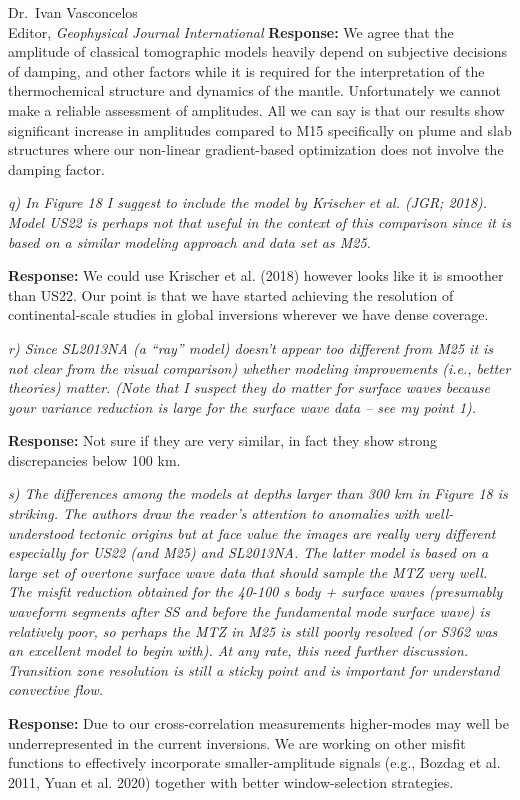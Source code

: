 \documentclass[11pt,a4paper]{letter}
\newcommand{\response}[1]{\textbf{Response:} #1}
\newcommand{\rev}[1]{{\it{#1}}}
\begin{document}
\begin{letter}{Dr.~Ivan Vasconcelos\\
Editor, \textit{Geophysical Journal International}}
\response{We agree that the amplitude of classical tomographic models heavily depend on subjective decisions of damping, and other factors while it is required for the interpretation of the thermochemical structure and dynamics of the mantle. Unfortunately we cannot make a reliable assessment of amplitudes. All we can say is that our results show significant increase in amplitudes compared to M15 specifically on plume and slab structures where our non-linear gradient-based optimization does not involve the damping factor.}


\rev{q) In Figure 18 I suggest to include the model by Krischer et al. (JGR; 2018). Model US22 is perhaps not that useful in the context of this comparison since it is based on a similar modeling approach and data set as M25.}

\response{We could use Krischer et al. (2018) however looks like it is smoother than US22. Our point is that we have started achieving the resolution of continental-scale studies in global inversions wherever we have dense coverage.}

\rev{r) Since SL2013NA (a ``ray'' model) doesn't appear too different from M25 it is not clear from the visual comparison) whether modeling improvements (i.e., better theories) matter.
(Note that I suspect they do matter for surface waves because your variance reduction is large for the surface wave data -- see my point 1).}

\response{Not sure if they are very similar, in fact they show strong discrepancies below 100 km. }

\rev{s) The differences among the models at depths larger than 300 km in Figure 18 is striking.
The authors draw the reader's attention to anomalies with well-understood tectonic origins but at face value the images are really very different especially for US22 (and M25) and SL2013NA.
The latter model is based on a large set of overtone surface wave data that should sample the MTZ very well. The misfit reduction obtained for the 40-100 s body + surface waves (presumably waveform segments after SS and before the fundamental mode surface wave) is relatively poor, so perhaps the MTZ in M25 is still poorly resolved (or S362 was an excellent model to begin with).
At any rate, this need further discussion. Transition zone resolution is still a sticky point and is important for understand convective flow.}

\response{Due to our cross-correlation measurements higher-modes may well be underrepresented in the current inversions. We are working on other misfit functions to effectively incorporate smaller-amplitude signals (e.g., Bozdag et al. 2011, Yuan et al. 2020) together with better window-selection strategies.}


\end{letter}
\end{document}
